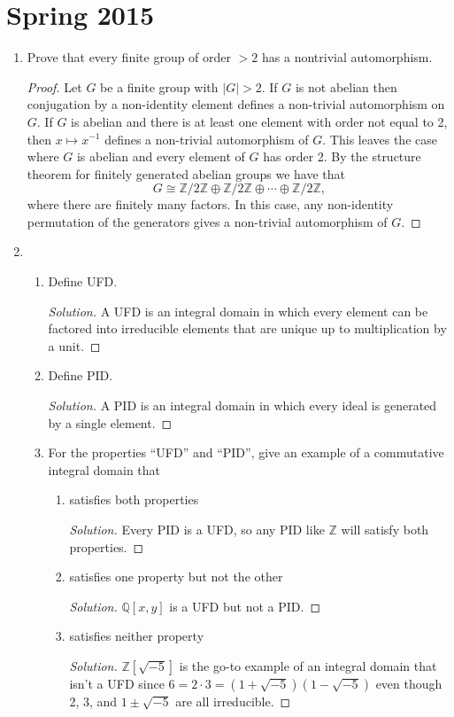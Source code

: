 \documentclass[11pt,letterpaper]{report}
\newcommand{\integers}{\mathbb{Z}}
\newcommand{\rationals}{\mathbb{Q}}
\newenvironment{solution}
{\begin{proof}[Solution]}
{\end{proof}}
\begin{document}
\section*{Spring 2015}
\begin{enumerate}
	\item Prove that every finite group of order $>2$ has a nontrivial automorphism.
	\begin{proof}
		Let $G$ be a finite group with $|G|>2$. If $G$ is not abelian then conjugation by a non-identity element defines a non-trivial automorphism on $G$. If $G$ is abelian and there is at least one element with order not equal to 2, then $x\mapsto x^{-1}$ defines a non-trivial automorphism of $G$. This leaves the case where $G$ is abelian and every element of $G$ has order 2. By the structure theorem for finitely generated abelian groups we have that
		\[
		G \cong \integers/2\integers \oplus \integers/2\integers \oplus \cdots \oplus \integers/2\integers,
		\]
		where there are finitely many factors. In this case, any non-identity permutation of the generators gives a non-trivial automorphism of $G$.
	\end{proof}

	\item \begin{enumerate}
		\item Define UFD.
		\begin{solution}
			A UFD is an integral domain in which every element can be factored into irreducible elements that are unique up to multiplication by a unit.
		\end{solution}
		\item Define PID.
		\begin{solution}
			A PID is an integral domain in which every ideal is generated by a single element.
		\end{solution}
		\item For the properties ``UFD'' and ``PID'', give an example of a commutative integral domain that
		\begin{enumerate}
			\item satisfies both properties
			\begin{solution}
				Every PID is a UFD, so any PID like $\integers$ will satisfy both properties.
			\end{solution}
			\item satisfies one property but not the other
			\begin{solution}
				$\rationals[x,y]$ is a UFD but not a PID.
			\end{solution}
			\item satisfies neither property
			\begin{solution}
				$\integers[\sqrt{-5}]$ is the go-to example of an integral domain that isn't a UFD since $6 = 2\cdot 3 = (1+\sqrt{-5})(1-\sqrt{-5})$ even though 2, 3, and $1\pm \sqrt{-5}$ are all irreducible.
			\end{solution}
		\end{enumerate}
	\end{enumerate}


\end{enumerate}
\end{document}
